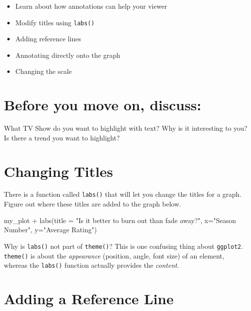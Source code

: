 \documentclass[
  letterpaper,
  DIV=11,
  numbers=noendperiod]{scrreprt}
\newenvironment{Shaded}{\begin{snugshade}}{\end{snugshade}}
\newcommand{\NormalTok}[1]{\textcolor[rgb]{0.00,0.23,0.31}{#1}}
\providecommand{\tightlist}{%
  \setlength{\itemsep}{0pt}\setlength{\parskip}{0pt}}\usepackage{longtable,booktabs,array}
\begin{document}

\begin{itemize}
\tightlist
\item
  Learn about how annotations can help your viewer
\item
  Modify titles using \texttt{labs()}
\item
  Adding reference lines
\item
  Annotating directly onto the graph
\item
  Changing the scale
\end{itemize}

\section*{Before you move on,
discuss:}\label{before-you-move-on-discuss}


What TV Show do you want to highlight with text? Why is it interesting
to you? Is there a trend you want to highlight?

\section*{Changing Titles}\label{changing-titles}


There is a function called \texttt{labs()} that will let you change the
titles for a graph. Figure out where these titles are added to the graph
below.

\begin{Shaded}
\begin{Highlighting}[]
\NormalTok{my\_plot +}
\NormalTok{  labs(title = "Is it better to burn out than fade away?",}
\NormalTok{       x="Season Number", }
\NormalTok{       y="Average Rating")}
\end{Highlighting}
\end{Shaded}

Why is \texttt{labs()} not part of \texttt{theme()}? This is one
confusing thing about \texttt{ggplot2}. \texttt{theme()} is about the
\emph{appearance} (position, angle, font size) of an element, whereas
the \texttt{labs()} function actually provides the \emph{content}.

\section*{Adding a Reference Line}\label{adding-a-reference-line}
\end{document}
